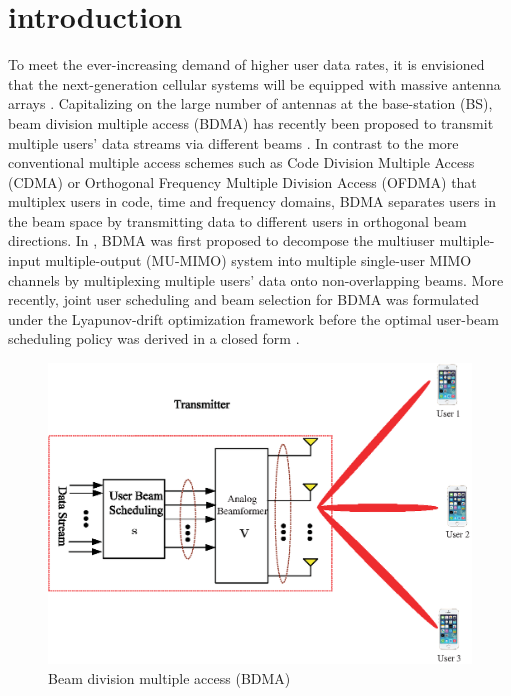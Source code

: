\documentclass[conference]{IEEEtran}
\begin{document}
\section{introduction}
To meet the ever-increasing demand of higher user data rates, it is envisioned that the next-generation cellular systems will be equipped with massive antenna arrays \cite{boccardi2014five}. Capitalizing on the large number of antennas at the base-station (BS), beam division multiple access (BDMA) has recently been proposed to transmit multiple users' data streams via different beams \cite{sun2015beam, Jiang2018}. In contrast to the more conventional multiple access schemes such as Code Division Multiple Access (CDMA) or Orthogonal Frequency Multiple Division Access (OFDMA) that multiplex users in code, time and frequency domains, BDMA separates users in the beam space by transmitting data to different users in orthogonal beam directions. In \cite{sun2015beam}, BDMA was first proposed to decompose the multiuser multiple-input multiple-output (MU-MIMO) system into multiple single-user MIMO channels by multiplexing multiple users' data onto non-overlapping beams. More recently, joint user scheduling and beam selection for BDMA was formulated under the Lyapunov-drift optimization framework before the optimal user-beam scheduling policy was derived in a closed form \cite{Jiang2018}.

\begin{figure}[h]
    \begin{center}
	\includegraphics[scale=0.5]{Figure/BDMA.eps}
	\caption{Beam division multiple access (BDMA)}\label{fig:BDMA}
    \end{center}
\end{figure}
\end{document}
